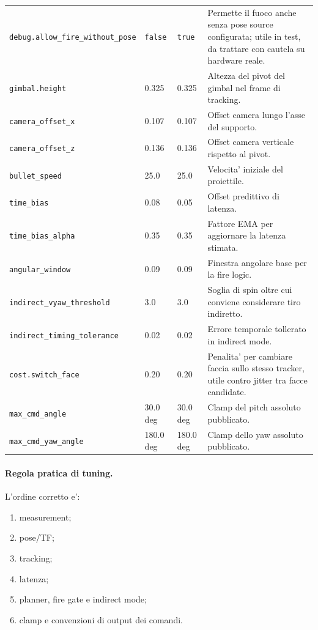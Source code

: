 \documentclass[11pt,a4paper]{article}
\newcommand{\code}[1]{\texttt{#1}}
\begin{document}
\begin{longtable}{p{} p{} p{} p{}}
\code{debug.allow\_fire\_without\_pose} & \code{false} & \code{true} & Permette il fuoco anche senza pose source configurata; utile in test, da trattare con cautela su hardware reale. \\
\code{gimbal.height} & 0.325 & 0.325 & Altezza del pivot del gimbal nel frame di tracking. \\
\code{camera\_offset\_x} & 0.107 & 0.107 & Offset camera lungo l'asse del supporto. \\
\code{camera\_offset\_z} & 0.136 & 0.136 & Offset camera verticale rispetto al pivot. \\
\code{bullet\_speed} & 25.0 & 25.0 & Velocita' iniziale del proiettile. \\
\code{time\_bias} & 0.08 & 0.05 & Offset predittivo di latenza. \\
\code{time\_bias\_alpha} & 0.35 & 0.35 & Fattore EMA per aggiornare la latenza stimata. \\
\code{angular\_window} & 0.09 & 0.09 & Finestra angolare base per la fire logic. \\
\code{indirect\_vyaw\_threshold} & 3.0 & 3.0 & Soglia di spin oltre cui conviene considerare tiro indiretto. \\
\code{indirect\_timing\_tolerance} & 0.02 & 0.02 & Errore temporale tollerato in indirect mode. \\
\code{cost.switch\_face} & 0.20 & 0.20 & Penalita' per cambiare faccia sullo stesso tracker, utile contro jitter tra facce candidate. \\
\code{max\_cmd\_angle} & 30.0 deg & 30.0 deg & Clamp del pitch assoluto pubblicato. \\
\code{max\_cmd\_yaw\_angle} & 180.0 deg & 180.0 deg & Clamp dello yaw assoluto pubblicato. \\
\bottomrule
\end{longtable}

\paragraph{Regola pratica di tuning.}
L'ordine corretto e':
\begin{enumerate}[leftmargin=1.4em]
  \item measurement;
  \item pose/TF;
  \item tracking;
  \item latenza;
  \item planner, fire gate e indirect mode;
  \item clamp e convenzioni di output dei comandi.
\end{enumerate}
\end{document}
